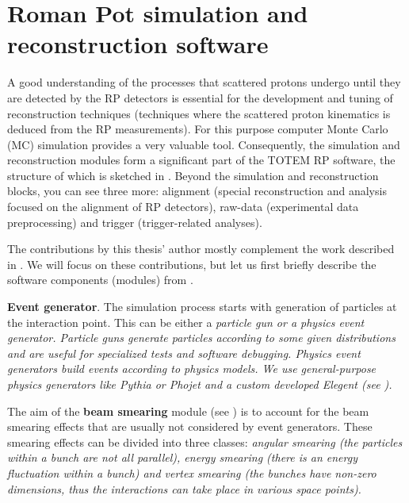 \iffalse
RP, MC, IP5, CMS, T1, T2, VFAT, DIGI, RECO, LAB, LHC, LS, DPE, MC, TOTEM, RMS, ndf
\fi


\chapter[sr]{Roman Pot simulation and reconstruction software}



A good understanding of the processes that scattered protons undergo until they are detected by the RP detectors is essential for the development and tuning of reconstruction techniques (techniques where the scattered proton kinematics is deduced from the RP measurements). For this purpose computer Monte Carlo (MC) simulation provides a very valuable tool. Consequently, the simulation and reconstruction modules form a significant part of the TOTEM RP software, the structure of which is sketched in . Beyond the simulation and reconstruction blocks, you can see three more: alignment (special reconstruction and analysis focused on the alignment of RP detectors), raw-data (experimental data preprocessing) and trigger (trigger-related analyses).

The contributions by this thesis' author mostly complement the work described in . We will focus on these contributions, but let us first briefly describe the software components (modules) from .

\> {\bf Event generator}.
The simulation process starts with generation of particles at the interaction point. This can be either a \em{particle gun} or a \em{physics event generator}. Particle guns generate particles according to some given distributions and are useful for specialized tests and software debugging. Physics event generators build events according to physics models. We use general-purpose physics generators like Pythia  or Phojet  and a custom developed Elegent (see ).

\> The aim of the {\bf beam smearing} module (see ) is to account for the beam smearing effects that are usually not considered by event generators. These smearing effects can be divided into three classes: \em{angular smearing} (the particles within a bunch are not all parallel), \em{energy smearing} (there is an energy fluctuation within a bunch) and \em{vertex smearing} (the bunches have non-zero dimensions, thus the interactions can take place in various space points). 

